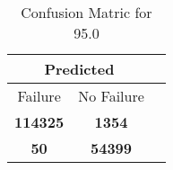 \begin{table}[] 
\caption{Confusion Matric for 95.0} 
\label{Table: Prediction Accuracy-DMD95.0OnlySunEKF-resetReflectionEKF-top2perfectNoFailurePrediction-Reflection} 
\centering 
\begin{tabular} 
 {@{}ccc@{}} 
\toprule 
\multicolumn{2}{c}{\textbf{Predicted}}
 \\ \midrule 
\multicolumn{1}{|c|}{Failure} & 
\multicolumn{1}{c|}{No Failure}
 \\ \midrule 
\multicolumn{1}{|c|}{\color{green}\textbf{114325}} & 
\multicolumn{1}{c|}{\color{red}\textbf{1354}}
 \\ \midrule 
\multicolumn{1}{|c|}{\color{red}\textbf{50}} & 
\multicolumn{1}{c|}{\color{green}\textbf{54399}}
 \\ \bottomrule 
\end{tabular} 
\end{table} 
